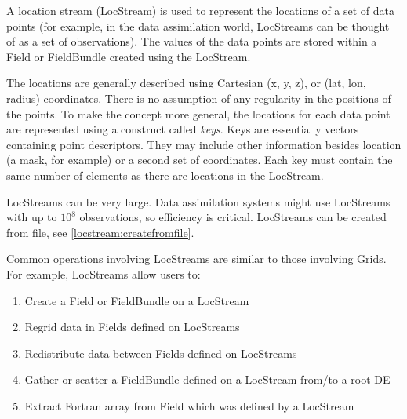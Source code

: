 %

A location stream (LocStream) is used to represent the locations of
a set of data points (for example, in the data assimilation world, 
LocStreams can be thought of as a set of observations).  The values 
of the data points are stored within a Field or FieldBundle created 
using the LocStream.

The locations are generally
described using Cartesian (x, y, z), or (lat, lon, radius) coordinates.
There is no assumption of any regularity in the positions of the points.
To make the concept more general, the locations for each data point are
represented using a construct called {\it keys}. Keys are essentially 
vectors containing point descriptors.  They may include 
other information besides location (a mask, for example) or a second 
set of coordinates.  Each key must contain the same number of elements 
as there are locations in the LocStream.

LocStreams can be very large. Data assimilation systems might use
LocStreams with up to $10^{8}$ observations, so efficiency is critical.
LocStreams can be created from file, see \ref{locstream:createfromfile}.

Common operations involving LocStreams are similar to those involving Grids.
For example, LocStreams allow users to:

\begin{enumerate}
\item Create a Field or FieldBundle on a LocStream
\item Regrid data in Fields defined on LocStreams
\item Redistribute data between Fields defined on LocStreams
\item Gather or scatter a FieldBundle defined on a LocStream from/to a root DE
\item Extract Fortran array from Field which was defined by a LocStream
\end{enumerate}



